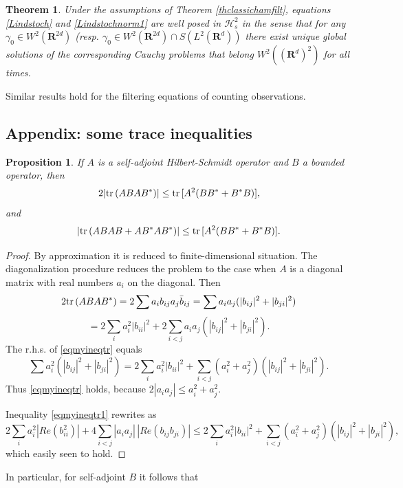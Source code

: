 \documentclass[12pt]{article}
\def\HC{\mathcal{H}}
\def\R{\mathbf{R}}
\def\tr{\rm{tr}}
\def\ga{\gamma}
\newtheorem{prop}{Proposition}[section]
\newtheorem{theorem}{Theorem}[section]
\begin{document}
\begin{theorem}
\label{thclassichamfiltmix}
Under the assumptions of Theorem \ref{thclassichamfilt},  equations
  \eqref{Lindstoch} and \eqref{Lindstochnorm1} are well posed in $\HC_s^2$ in the sense that for any
  $\ga_0\in W^2(\R^{2d})$ (resp. $\ga_0\in W^2(\R^{2d})\cap S(L^2(\R^d))$ there
 exist unique global solutions of the corresponding Cauchy problems that belong
$W^2((\R^d)^2)$ for all times.
\end{theorem}

Similar results hold for the filtering equations of counting observations.


\subsection{Appendix: some trace inequalities}

\begin{prop}
If $A$ is a self-adjoint Hilbert-Schmidt operator and $B$ a bounded operator, then
\begin{equation}
\label{eqmyineqtr}
2|{\tr} \, (ABAB^*)|\le {\tr} \, [A^2(BB^*+B^*B)],
\end{equation}
and
\begin{equation}
\label{eqmyineqtr1}
|{\tr} \, (AB AB +AB^*AB^*)|\le {\tr} \, [A^2 (BB^*+B^*B)].
\end{equation}
\end{prop}

\begin{proof}
By approximation it is reduced to finite-dimensional situation. The diagonalization procedure reduces
the problem to the case when $A$ is a diagonal matrix with real numbers $a_i$ on the diagonal. Then
 \[
 2{\tr} \, (ABAB^*)
=2\sum a_ib_{ij}a_j\bar b_{ij}=\sum a_i a_j (|b_{ij}|^2+|b_{ji}|^2)
\]
\[
=2\sum_i a_i^2 |b_{ii}|^2+2\sum_{i<j}a_ia_j(|b_{ij}|^2+|b_{ji}|^2).
\]
The r.h.s. of \eqref{eqmyineqtr} equals
\[
\sum a_i^2 (|b_{ij}|^2+|b_{ji}|^2)
=2\sum_i a_i^2 |b_{ii}|^2+ \sum_{i < j}(a_i^2+a_j^2)(|b_{ij}|^2+|b_{ji}|^2).
\]
Thus \eqref{eqmyineqtr} holds, because $2|a_ia_j| \le a_i^2 +a_j^2$.

Inequality \eqref{eqmyineqtr1} rewrites as
\[
2\sum_i a_i^2 |Re (b_{ii}^2)|+4\sum_{i<j}|a_ia_j| \, |Re (b_{ij} b_{ji})|
\le 2\sum_i a_i^2 |b_{ii}|^2+ \sum_{i < j}(a_i^2+a_j^2)(|b_{ij}|^2+|b_{ji}|^2),
\]
which easily seen to hold.
\end{proof}

In particular, for self-adjoint $B$ it follows that
\end{document}
